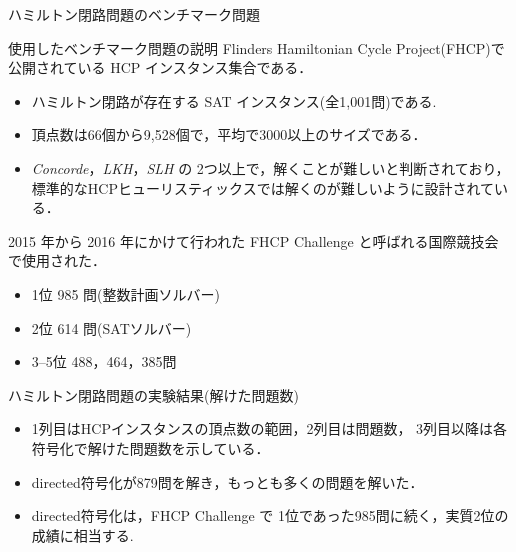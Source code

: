 \documentclass[dvipdfmx,10pt]{beamer}
\begin{document}
\begin{frame}{ハミルトン閉路問題のベンチマーク問題}
\begin{block}{使用したベンチマーク問題の説明}
Flinders Hamiltonian Cycle Project(FHCP)\footnotemark で
公開されている HCP インスタンス集合である．
\begin{itemize}
 \item ハミルトン閉路が存在する\alert{ SAT インスタンス(全1,001問)}である.
 \item 頂点数は66個から9,528個で，平均で3000以上のサイズである．
 \item \textit{Concorde}，\textit{LKH}，\textit{SLH} の
       2つ以上で，解くことが難しいと判断されており，
       標準的なHCPヒューリスティックスでは解くのが難しいように設計されている．
\end{itemize}
\end{block}
2015 年から 2016 年にかけて行われた FHCP Challenge と呼ばれる国際競技会で使用された．
\begin{itemize}
\item 1位 985 問(整数計画ソルバー)
\item 2位 614 問(SATソルバー)
\item 3--5位 488，464，385問
\end{itemize}
\end{frame}
\begin{frame}{ハミルトン閉路問題の実験結果(解けた問題数)}
\begin{itemize}
\item 1列目はHCPインスタンスの頂点数の範囲，2列目は問題数，
      3列目以降は各符号化で解けた問題数を示している．
\item \textsf{directed}符号化が879問を解き，もっとも多くの問題を解いた．
\item \textsf{directed}符号化は，FHCP Challenge で
      1位であった985問に続く，実質2位の成績に相当する.
\end{itemize}
\end{frame}
\end{document}
